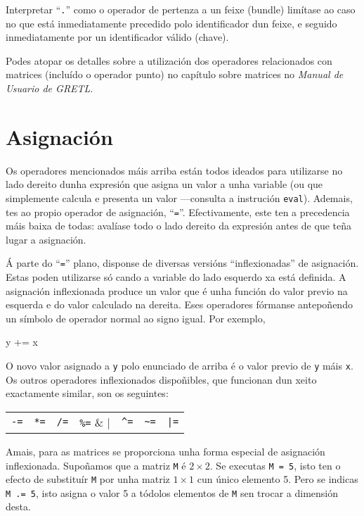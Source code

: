 Interpretar ``\texttt{.}'' como o operador de pertenza a un feixe (bundle)
limítase ao caso no que está inmediatamente precedido polo identificador
dun feixe, e seguido inmediatamente por un identificador válido (chave).

Podes atopar os detalles sobre a utilización dos operadores relacionados con
matrices (incluído o operador punto) no capítulo sobre matrices no
\textit{Manual de Usuario de GRETL}.

\section{Asignación}

Os operadores mencionados máis arriba están todos ideados para utilizarse no
lado dereito dunha expresión que asigna un valor a unha variable (ou que
simplemente calcula e presenta un valor ---consulta a instrución \texttt{eval}).
Ademais, tes ao propio operador de asignación, ``\texttt{=}''. Efectivamente,
este ten a precedencia máis baixa de todas: avalíase todo o lado dereito da
expresión antes de que teña lugar a asignación.

Á parte do ``\texttt{=}'' plano, disponse de diversas versións ``inflexionadas''
de asignación. Estas poden utilizarse só cando a variable do lado esquerdo
xa está definida. A asignación inflexionada produce un valor que é unha
función do valor previo na esquerda e do valor calculado na dereita. Eses
operadores fórmanse antepoñendo un símbolo de operador normal ao signo igual.
Por exemplo,
%
\begin{code}
y += x
\end{code}
%
O novo valor asignado a \texttt{y} polo enunciado de arriba é o valor
previo de \texttt{y} máis \texttt{x}. Os outros operadores inflexionados
dispoñibles, que funcionan dun xeito exactamente similar, son os
seguintes:

\begin{center}
\begin{tabular}{ccccccc}
\texttt{-=} & \texttt{*=} & \texttt{/=} & \verb|%=| & 
  \verb|^=| & \verb|~=| & \verb+|=+ \\
\end{tabular}
\end{center}

Amais, para as matrices se proporciona unha forma especial de asignación
inflexionada. Supoñamos que a matriz \texttt{M} é $2 \times 2$. Se executas
\texttt{M = 5}, isto ten o efecto de substituír \texttt{M} por unha matriz
$1 \times 1$ cun único elemento 5. Pero se indicas \texttt{M .= 5}, isto
asigna o valor 5 a tódolos elementos de \texttt{M} sen trocar a dimensión
desta.

